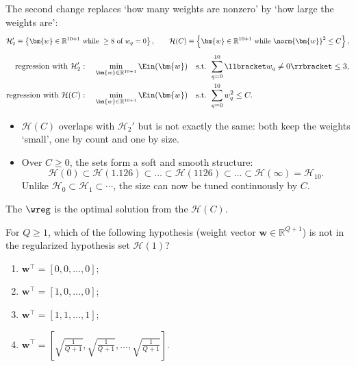 The second change replaces `how many weights are nonzero' by `how large the
weights are':
\[
    \mathcal{H}_2' \equiv \left\{ \bm{w} \in \mathbb{R}^{10+1} \text{ while }
    \ge 8 \text{ of } w_q = 0 \right\} ,
    \qquad
    \mathcal{H}(C) \equiv \left\{ \bm{w} \in \mathbb{R}^{10+1} \text{ while }
    \norm{\bm{w}}^2 \le C \right\} ,
\]
\begin{align*}
    \text{regression with } \mathcal{H}_2'&: \quad \min_{\bm{w} \in
    \mathbb{R}^{10+1}} \Ein(\bm{w}) \quad \text{s.t. } \sum_{q=0}^{10}
    \llbracket w_q \neq 0 \rrbracket \le 3 ,\\
    \text{regression with } \mathcal{H}(C)&: \quad \min_{\bm{w} \in
    \mathbb{R}^{10+1}} \Ein(\bm{w}) \quad \text{s.t. } \sum_{q=0}^{10} w_q^2
    \le C .
\end{align*}
\begin{itemize}
    \item \(\mathcal{H}(C)\) overlaps with \(\mathcal{H}_2'\) but is not exactly
        the same: both keep the weights `small', one by count and one by
        size.
    \item Over \(C \ge 0\), the sets form a soft and smooth structure:
        \[
            \mathcal{H}(0) \subset \mathcal{H}(1.126) \subset \ldots \subset
            \mathcal{H}(1126) \subset \ldots \subset \mathcal{H}(\infty) =
            \mathcal{H}_{10} .
        \]
        Unlike \(\mathcal{H}_0 \subset \mathcal{H}_1 \subset \cdots\), the
        size can now be tuned continuously by \(C\).
\end{itemize}

\begin{definition}\label{def:wreg}
    The  \(\wreg\) is the optimal solution from
    the  \(\mathcal{H}(C)\).
\end{definition}

\begin{exercise}
    For \(Q \ge 1\), which of the following hypothesis (weight vector \(\bm{w}
    \in \mathbb{R}^{Q+1}\)) is not in the regularized hypothesis set
    \(\mathcal{H}(1)\)?
    \begin{enumerate}[(1)]
        \item \(\bm{w}^\top = [0, 0, \ldots, 0]\);
        \item \(\bm{w}^\top = [1, 0, \ldots, 0]\);
        \item \(\bm{w}^\top = [1, 1, \ldots, 1]\);
        \item \(\bm{w}^\top = \left[ \sqrt{\frac{1}{Q+1}}, \sqrt{\frac{1}{Q+1}},
            \ldots, \sqrt{\frac{1}{Q+1}} \right]\).
    \end{enumerate}
\end{exercise}

